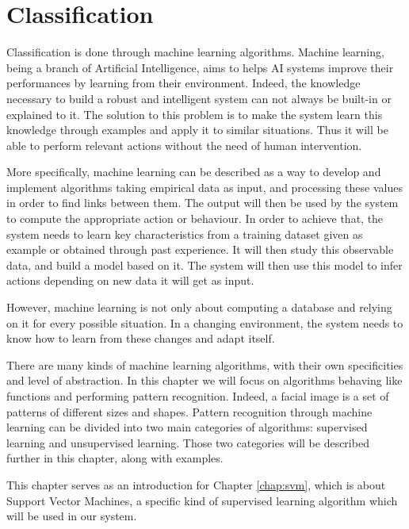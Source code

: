 \chapter{Classification}
\label{chap:classification}

\noindent Classification is done through machine learning algorithms. Machine learning, being a branch of Artificial Intelligence, aims to helps AI systems improve their performances by learning from their environment. Indeed, the knowledge necessary to build a robust and intelligent system can not always be built-in or explained to it. The solution to this problem is to make the system learn this knowledge through examples and apply it to similar situations. Thus it will be able to perform relevant actions without the need of human intervention. 
\newline

\noindent More specifically, machine learning can be described as a way to develop and implement algorithms taking empirical data as input, and processing these values in order to find links between them. The output will then be used by the system to compute the appropriate action or behaviour. In order to achieve that, the system needs to learn key characteristics from a training dataset given as example or obtained through past experience. It will then study this observable data, and build a model based on it. The system will then use this model to infer actions depending on new data it will get as input.
\newline

\noindent However, machine learning is not only about computing a database and relying on it for every possible situation. In a changing environment, the system needs to know how to learn from these changes and adapt itself.
\newline

\noindent There are many kinds of machine learning algorithms, with their own specificities and level of abstraction. In this chapter we will focus on algorithms behaving like functions and performing pattern recognition. Indeed, a facial image is a set of patterns of different sizes and shapes. Pattern recognition through machine learning can be divided into two main categories of algorithms: supervised learning and unsupervised learning. Those two categories will be described further in this chapter, along with examples.
\newline

\noindent This chapter serves as an introduction for Chapter \ref{chap:svm}, which is about Support Vector Machines, a specific kind of supervised learning algorithm which will be used in our system.
\newline

